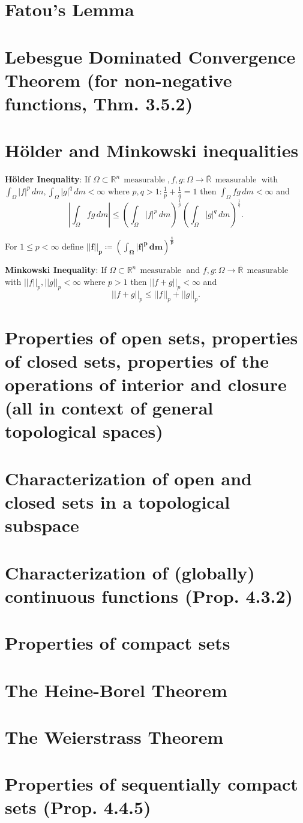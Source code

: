 \documentclass[letterpaper,11pt,intlimits,sumlimits]{amsart}
\newcommand{\norm}[1]{\left|\left|{#1}\right|\right|}
\newcommand{\abs}[1]{\left|{#1}\right|}
\newcommand{\closure}[1]{\overline{#1}}
\newcommand{\reals}{\mathbb{R}}
\newcommand{\keyphrase}[1]{\textbf{#1}}
\DeclareMathOperator{\measurable}{measurable}
\begin{document}
\section*{Fatou's Lemma}

\section*{Lebesgue Dominated Convergence Theorem (for non-negative functions, Thm. 3.5.2)}

\section*{H\"older and Minkowski inequalities}

\keyphrase{H\"older Inequality}: 
If $\Omega\subset\reals^{n}\,\measurable,
f,g:\Omega\to\closure{\reals}\,\measurable$ with
$\int_{\Omega}\abs{f}^{p}\,dm, \int_{\Omega}\abs{g}^{q}\,dm< \infty$ where
$p,q>1 : \frac{1}{p}+\frac{1}{q}=1$ then $\int_{\Omega}fg\,dm < \infty$ and
\[
    \abs{\int_{\Omega}fg\,dm}
    \leq 
    \left( \int_{\Omega} \abs{f}^{p}\,dm \right)^{\frac{1}{p}}
    \left( \int_{\Omega} \abs{g}^{q}\,dm \right)^{\frac{1}{q}}.
\]

For $1\leq{}p<\infty$ define $\boldsymbol{\norm{f}_{p} 
\coloneqq \left( \int_{\Omega} \abs{f}^{p}\,dm \right)^{\frac{1}{p}}}$

\keyphrase{Minkowski Inequality}:
If $\Omega\subset\reals^{n}\,\measurable$ and
$f,g:\Omega\to\closure{\reals}\,\measurable$ with 
$\norm{f}_{p}, \norm{g}_{p}< \infty$ where $p>1$ then
$\norm{f+g}_{p} < \infty$ and
\[
    \norm{f+g}_{p} \leq \norm{f}_{p}+\norm{g}_{p}.
\]

\section*{Properties of open sets, properties of closed sets, properties of the operations of interior and closure (all in context of general topological spaces)}

\section*{Characterization of open and closed sets in a topological subspace}

\section*{Characterization of (globally) continuous functions (Prop. 4.3.2)}

\section*{Properties of compact sets}

\section*{The Heine-Borel Theorem}

\section*{The Weierstrass Theorem}

\section*{Properties of sequentially compact sets (Prop. 4.4.5)}
\end{document}
